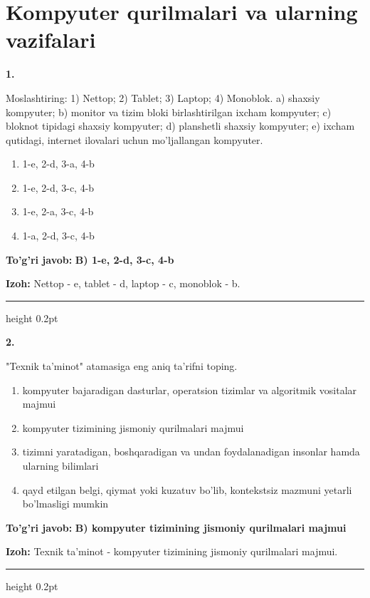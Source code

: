 \documentclass[10pt,a4paper]{article}
\begin{document}
\section{Kompyuter qurilmalari va ularning vazifalari}

{\bfseries\sffamily\color{ink} 1.}
\par
Moslashtiring: 1) Nettop; 2) Tablet; 3) Laptop; 4) Monoblok. a) shaxsiy kompyuter; b) monitor va tizim bloki birlashtirilgan ixcham kompyuter; c) bloknot tipidagi shaxsiy kompyuter; d) planshetli shaxsiy kompyuter; e) ixcham qutidagi, internet ilovalari uchun mo'ljallangan kompyuter.
\begin{enumerate}[label=\Alph*),leftmargin=9mm]
\item 1-e, 2-d, 3-a, 4-b
\item 1-e, 2-d, 3-c, 4-b
\item 1-e, 2-a, 3-c, 4-b
\item 1-a, 2-d, 3-c, 4-b
\end{enumerate}
\begin{tcolorbox}[enhanced,breakable,colback=teal!4,colframe=teal!60!black,boxrule=0.45pt,arc=1.2mm,left=2.7mm,right=2.7mm,top=1.8mm,bottom=1.8mm,before skip=2mm,after skip=2mm]
{\bfseries\sffamily\color{teal}To'g'ri javob:} \textbf{B) 1-e, 2-d, 3-c, 4-b}
\par\smallskip
{\bfseries Izoh:} Nettop - e, tablet - d, laptop - c, monoblok - b.
\end{tcolorbox}
\vspace{2mm}\hrule height 0.2pt\vspace{3mm}

{\bfseries\sffamily\color{ink} 2.}
\par
"Texnik ta'minot" atamasiga eng aniq ta'rifni toping.
\begin{enumerate}[label=\Alph*),leftmargin=9mm]
\item kompyuter bajaradigan dasturlar, operatsion tizimlar va algoritmik vositalar majmui
\item kompyuter tizimining jismoniy qurilmalari majmui
\item tizimni yaratadigan, boshqaradigan va undan foydalanadigan insonlar hamda ularning bilimlari
\item qayd etilgan belgi, qiymat yoki kuzatuv bo'lib, kontekstsiz mazmuni yetarli bo'lmasligi mumkin
\end{enumerate}
\begin{tcolorbox}[enhanced,breakable,colback=teal!4,colframe=teal!60!black,boxrule=0.45pt,arc=1.2mm,left=2.7mm,right=2.7mm,top=1.8mm,bottom=1.8mm,before skip=2mm,after skip=2mm]
{\bfseries\sffamily\color{teal}To'g'ri javob:} \textbf{B) kompyuter tizimining jismoniy qurilmalari majmui}
\par\smallskip
{\bfseries Izoh:} Texnik ta'minot - kompyuter tizimining jismoniy qurilmalari majmui.
\end{tcolorbox}
\vspace{2mm}\hrule height 0.2pt\vspace{3mm}
\end{document}
